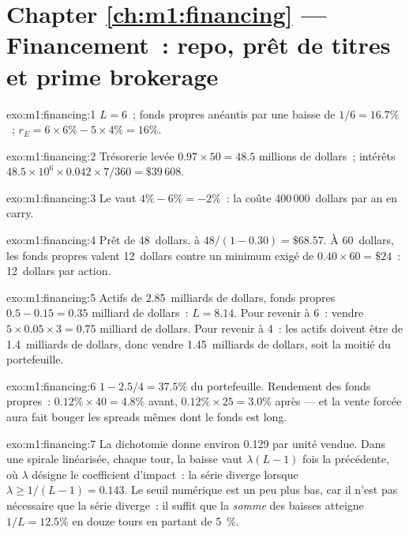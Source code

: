 \section*{Chapter \ref{ch:m1:financing} --- Financement~: repo, prêt de titres et prime brokerage}

\begin{solution}{exo:m1:financing:1}
$L = 6$~; fonds propres anéantis par une baisse de $1/6 = 16.7\%$~; $r_E = 6 \times 6\% - 5
\times 4\% = 16\%$.
\end{solution}

\begin{solution}{exo:m1:financing:2}
Trésorerie levée $0.97 \times 50 = 48.5$ millions de dollars~; intérêts $48.5\times10^6
\times 0.042 \times 7/360 = \$39\,608$.
\end{solution}

\begin{solution}{exo:m1:financing:3}
Le  vaut $4\% - 6\% = -2\%$~: la  coûte 400\,000~dollars par an en carry.
\end{solution}

\begin{solution}{exo:m1:financing:4}
Prêt de 48~dollars.  à $48/(1-0.30) = \$68.57$. À 60~dollars, les fonds propres valent 12~dollars
contre un minimum exigé de $0.40\times60 = \$24$~: 12~dollars par action.
\end{solution}

\begin{solution}{exo:m1:financing:5}
Actifs de 2.85~milliards de dollars, fonds propres $0.5 - 0.15 = 0.35$ milliard de dollars~: $L = 8.14$.
Pour revenir à 6~: vendre $5 \times 0.05 \times 3 = 0.75$ milliard de dollars. Pour revenir à 4~: les actifs doivent
être de 1.4~milliards de dollars, donc vendre 1.45~milliards de dollars, soit la moitié du portefeuille.
\end{solution}

\begin{solution}{exo:m1:financing:6}
$1 - 2.5/4 = 37.5\%$ du portefeuille. Rendement des fonds propres~: $0.12\% \times 40 =
4.8\%$ avant, $0.12\% \times 25 = 3.0\%$ après --- et la vente forcée aura
fait bouger les spreads mêmes dont le fonds est long.
\end{solution}

\begin{solution}{exo:m1:financing:7}
La dichotomie donne environ 0.129 par unité vendue. Dans une spirale linéarisée, chaque
tour, la baisse vaut $\lambda(L-1)$ fois la précédente, où $\lambda$ désigne le
coefficient d'impact~: la série diverge lorsque $\lambda \ge 1/(L-1) = 0.143$. Le seuil numérique
est un peu plus bas, car il n'est pas nécessaire que la série diverge~: il suffit
que la \emph{somme} des baisses atteigne $1/L = 12.5\%$ en douze
tours en partant de 5~\%.
\end{solution}

